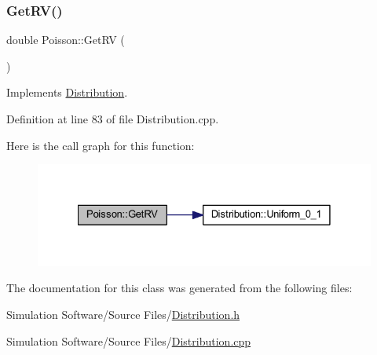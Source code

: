 \subsubsection{\texorpdfstring{Get\+R\+V()}{GetRV()}}
{\footnotesize\ttfamily double Poisson\+::\+Get\+RV (\begin{DoxyParamCaption}{ }\end{DoxyParamCaption})\hspace{0.3cm}{\ttfamily [virtual]}}



Implements \hyperlink{class_distribution_a63b433850d7b47d84eb69448f7916719}{Distribution}.



Definition at line 83 of file Distribution.\+cpp.

Here is the call graph for this function\+:
\nopagebreak
\begin{figure}[H]
\begin{center}
\leavevmode
\includegraphics[width=328pt]{class_poisson_a068964aa05df4051b23a84d71529fb69_cgraph}
\end{center}
\end{figure}


The documentation for this class was generated from the following files\+:\begin{DoxyCompactItemize}
\item 
Simulation Software/\+Source Files/\hyperlink{_distribution_8h}{Distribution.\+h}\item 
Simulation Software/\+Source Files/\hyperlink{_distribution_8cpp}{Distribution.\+cpp}\end{DoxyCompactItemize}
